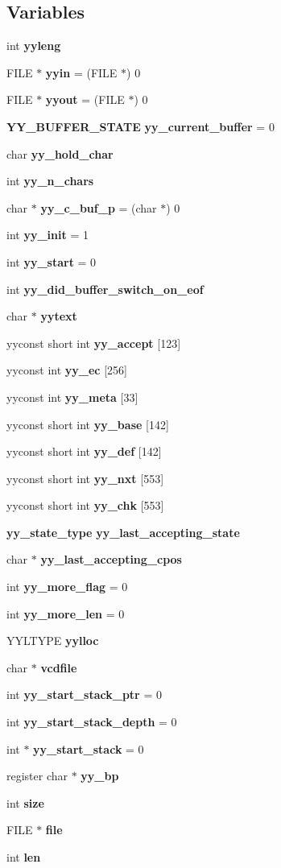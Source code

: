 \subsection*{Variables}
\begin{CompactItemize}
\item 
int {\bf yyleng}
\item 
FILE $\ast$ {\bf yyin} = (FILE $\ast$) 0
\item 
FILE $\ast$ {\bf yyout} = (FILE $\ast$) 0
\item 
{\bf YY\_\-BUFFER\_\-STATE} {\bf yy\_\-current\_\-buffer} = 0
\item 
char {\bf yy\_\-hold\_\-char}
\item 
int {\bf yy\_\-n\_\-chars}
\item 
char $\ast$ {\bf yy\_\-c\_\-buf\_\-p} = (char $\ast$) 0
\item 
int {\bf yy\_\-init} = 1
\item 
int {\bf yy\_\-start} = 0
\item 
int {\bf yy\_\-did\_\-buffer\_\-switch\_\-on\_\-eof}
\item 
char $\ast$ {\bf yytext}
\item 
yyconst short int {\bf yy\_\-accept} [123]
\item 
yyconst int {\bf yy\_\-ec} [256]
\item 
yyconst int {\bf yy\_\-meta} [33]
\item 
yyconst short int {\bf yy\_\-base} [142]
\item 
yyconst short int {\bf yy\_\-def} [142]
\item 
yyconst short int {\bf yy\_\-nxt} [553]
\item 
yyconst short int {\bf yy\_\-chk} [553]
\item 
{\bf yy\_\-state\_\-type} {\bf yy\_\-last\_\-accepting\_\-state}
\item 
char $\ast$ {\bf yy\_\-last\_\-accepting\_\-cpos}
\item 
int {\bf yy\_\-more\_\-flag} = 0
\item 
int {\bf yy\_\-more\_\-len} = 0
\item 
YYLTYPE {\bf yylloc}
\item 
char $\ast$ {\bf vcdfile}
\item 
int {\bf yy\_\-start\_\-stack\_\-ptr} = 0
\item 
int {\bf yy\_\-start\_\-stack\_\-depth} = 0
\item 
int $\ast$ {\bf yy\_\-start\_\-stack} = 0
\item 
register char $\ast$ {\bf yy\_\-bp}
\item 
int {\bf size}
\item 
FILE $\ast$ {\bf file}
\item 
int {\bf len}
\end{CompactItemize}


